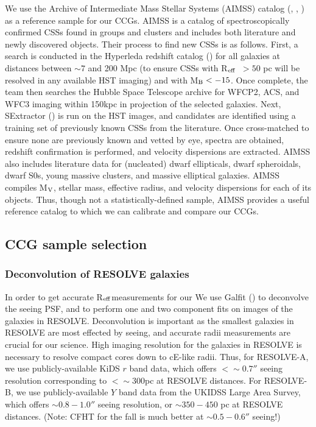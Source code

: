 \documentclass[iop,apj,twocolappendix]{emulateapj}
\newcommand{\Reff}{R$_{\rm eff}$}
\begin{document}
\noindent We use the Archive of Intermediate Mass Stellar Systems (AIMSS) catalog (\cite{Norris2014}, \cite{Forbes2014}, \cite{Janz2015}) as a reference sample for our CCGs.  AIMSS is a catalog of spectroscopically confirmed CSSs found in groups and clusters and includes both literature and newly discovered objects. Their process to find new CSSs is as follows. First, a search is conducted in the Hyperleda redshift catalog (\cite{Paturel2003}) for all galaxies at distances between $\sim 7$ and 200 Mpc (to ensure CSSs with \Reff\ $> 50$ pc will be resolved in any available HST imaging) and with M$_{\rm B} < -15$. Once complete, the team then searches the Hubble Space Telescope archive for WFCP2, ACS, and WFC3 imaging within 150kpc in projection of the selected galaxies. Next, SExtractor (\cite{Bertin1996}) is run on the HST images, and candidates are identified using a training set of previously known CSSs from the literature. Once cross-matched to ensure none are previously known and vetted by eye, spectra are obtained, redshift confirmation is performed, and velocity dispersions are extracted. AIMSS also includes literature data for (nucleated) dwarf ellipticals, dwarf spheroidals, dwarf S0s, young massive clusters, and massive elliptical galaxies. AIMSS compiles M$_{\rm V}$, stellar mass, effective radius, and velocity dispersions for each of its objects. Thus, though not a statistically-defined sample, AIMSS provides a useful reference catalog to which we can calibrate and compare our CCGs.

\subsection{CCG sample selection}

\subsubsection{Deconvolution of RESOLVE galaxies}
\label{deconv}

\noindent In order to get accurate \Reff measurements for our We use Galfit (\cite{Peng2002}) to deconvolve the seeing PSF, and to perform one and two component fits on images of the galaxies in RESOLVE. Deconvolution is important as the smallest galaxies in RESOLVE are most effected by seeing, and accurate radii measurements are crucial for our science. High imaging resolution for the galaxies in RESOLVE is necessary to resolve compact cores down to cE-like radii. Thus, for RESOLVE-A, we use publicly-available KiDS $r$ band data, which offers $< \sim0.7''$ seeing resolution corresponding to $< \sim300$pc at RESOLVE distances. For RESOLVE-B, we use publicly-available $Y$ band data from the UKIDSS Large Area Survey, which offers $\sim 0.8-1.0''$ seeing resolution, or $\sim350-450$ pc at RESOLVE distances. (Note: CFHT for the fall is much better at $\sim0.5-0.6''$ seeing!)
\end{document}
